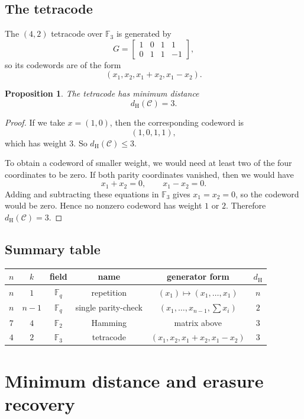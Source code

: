 \documentclass[11pt]{article}
\newtheorem{proposition}{Proposition}[section]
\theoremstyle{definition}
\theoremstyle{remark}
\newcommand{\F}{\mathbb{F}}
\newcommand{\code}{\mathcal{C}}
\newcommand{\dH}{d_{\mathrm H}}
\begin{document}
\subsection{The tetracode}

The $(4,2)$ tetracode over $\F_3$ is generated by
\[
G=
\begin{bmatrix}
1&0&1&1\\
0&1&1&-1
\end{bmatrix},
\]
so its codewords are of the form
\[
(x_1,x_2,x_1+x_2,x_1-x_2).
\]

\begin{proposition}
The tetracode has minimum distance
\[
\dH(\code)=3.
\]
\end{proposition}

\begin{proof}
If we take $x=(1,0)$, then the corresponding codeword is
\[
(1,0,1,1),
\]
which has weight $3$. So $\dH(\code)\le 3$.

To obtain a codeword of smaller weight, we would need at least two of the four coordinates to be zero. If both parity coordinates vanished, then we would have
\[
x_1+x_2=0,\qquad x_1-x_2=0.
\]
Adding and subtracting these equations in $\F_3$ gives $x_1=x_2=0$, so the codeword would be zero. Hence no nonzero codeword has weight $1$ or $2$. Therefore $\dH(\code)=3$.
\end{proof}

\subsection{Summary table}

\begin{center}
\renewcommand{\arraystretch}{1.2}
\begin{tabular}{@{}cccccc@{}}
\toprule
$n$ & $k$ & field & name & generator form & $\dH$ \\
\midrule
$n$ & $1$ & $\F_q$ & repetition & $(x_1)\mapsto(x_1,\dots,x_1)$ & $n$ \\
$n$ & $n-1$ & $\F_q$ & single parity-check & $(x_1,\dots,x_{n-1},\sum x_i)$ & $2$ \\
$7$ & $4$ & $\F_2$ & Hamming & matrix above & $3$ \\
$4$ & $2$ & $\F_3$ & tetracode & $(x_1,x_2,x_1+x_2,x_1-x_2)$ & $3$ \\
\bottomrule
\end{tabular}
\end{center}

\section{Minimum distance and erasure recovery}
\end{document}
